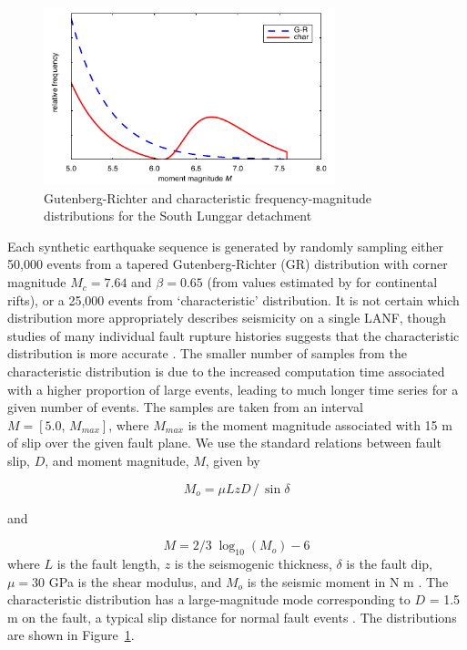 \documentclass[twocolumn,grl]{AGUTeX}
\begin{document}
\begin{article}
\begin{figure}[b]
\noindent\includegraphics[width=20pc]{./figures/F-Ms.pdf}
\caption{Gutenberg-Richter and characteristic frequency-magnitude 
 		 distributions for the South Lunggar detachment}
\label{fig:fms}
\end{figure}

Each synthetic earthquake sequence is generated by randomly sampling either
50,000 events from a tapered Gutenberg-Richter (GR) distribution with corner
magnitude $M_c = 7.64$ and $\beta = 0.65$ (from values estimated by
\citet{birdkagan2004f_m} for continental rifts), or a 25,000 events from
`characteristic' distribution. It is not certain which distribution more
appropriately describes seismicity on a single LANF, though studies of many
individual fault rupture histories suggests that the characteristic
distribution is more accurate \citep{hecker2013eqdist}.  The smaller number of
samples from the characteristic distribution is due to the increased
computation time associated with a higher proportion of large events, leading
to much longer time series for a given number of events.  The samples are taken
from an interval $M = [5.0, \, M_{max}]$, where $M_{max}$ is the moment
magnitude associated with 15 m of slip over the given fault plane.  We use the
standard relations between fault slip, $D$, and moment magnitude, $M$, given by

\begin{equation}
 M_o = \mu L z D \,/ \, \sin \delta 
 \end{equation}

and

\begin{equation}
M = 2/3 \; \log_{10} (M_o) - 6
\end{equation}
where $L$ is the fault length, $z$ is the seismogenic thickness, $\delta$ is
the fault dip, $\mu = 30$ GPa is the shear modulus, and $M_o$ is the seismic
moment in N m \citep{kagan2003pepi}.  The characteristic distribution has
a large-magnitude mode corresponding to $D$ = 1.5 m on the fault, a typical
slip distance for normal fault events
\citep[e.g.][]{wesnousky2008displacement}.  The distributions are shown in
Figure~\ref{fig:fms}.


\end{article}
\end{document}
